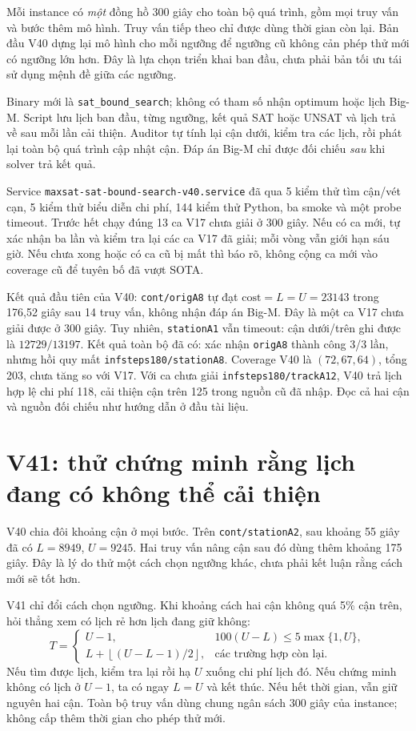 \documentclass[11pt,a4paper]{article}
\newcommand{\code}[1]{\texttt{#1}}
\newcommand{\file}[1]{\nolinkurl{#1}}
\begin{document}
Mỗi instance có \emph{một} đồng hồ 300 giây cho toàn bộ quá trình, gồm
mọi truy vấn và bước thêm mô hình. Truy vấn tiếp theo chỉ được dùng thời
gian còn lại. Bản đầu V40 dựng lại mô hình cho mỗi ngưỡng để ngưỡng cũ
không cản phép thử mới có ngưỡng lớn hơn. Đây là lựa chọn triển khai ban
đầu, chưa phải bản tối ưu tái sử dụng mệnh đề giữa các ngưỡng.

Binary mới là \file{sat\_bound\_search}; không có tham số nhận optimum
hoặc lịch Big-M. Script lưu lịch ban đầu, từng ngưỡng, kết quả SAT hoặc
UNSAT và lịch trả về sau mỗi lần cải thiện. Auditor tự tính lại cận dưới,
kiểm tra các lịch, rồi phát lại toàn bộ quá trình cập nhật cận.
Đáp án Big-M chỉ được đối chiếu \emph{sau} khi solver trả kết quả.

Service \file{maxsat-sat-bound-search-v40.service} đã qua 5 kiểm thử tìm
cận/vét cạn, 5 kiểm thử biểu diễn chi phí, 144 kiểm thử Python, ba smoke
và một probe timeout. Trước hết chạy đúng 13 ca V17 chưa giải ở 300 giây.
Nếu có ca mới, tự xác nhận ba lần và kiểm tra lại các ca V17 đã giải;
mỗi vòng vẫn giới hạn sáu giờ. Nếu chưa xong hoặc có ca cũ bị mất thì
báo rõ, không cộng ca mới vào coverage cũ để tuyên bố đã vượt SOTA.

Kết quả đầu tiên của V40: \code{cont/origA8} tự đạt
$\mathrm{cost}=L=U=23143$ trong 176,52 giây sau 14 truy vấn, không nhận
đáp án Big-M. Đây là một ca V17 chưa giải được ở 300 giây. Tuy nhiên,
\code{stationA1} vẫn timeout: cận dưới/trên ghi được là $12729/13197$.
Kết quả toàn bộ đã có: xác nhận \code{origA8} thành công 3/3 lần, nhưng
hồi quy mất \code{infsteps180/stationA8}. Coverage V40 là $(72,67,64)$,
tổng 203, chưa tăng so với V17. Với ca chưa giải \code{infsteps180/trackA12},
V40 trả lịch hợp lệ chi phí 118, cải thiện cận trên 125 trong nguồn cũ đã
nhập. Đọc cả hai cận và nguồn đối chiếu như hướng dẫn ở đầu tài liệu.

\section{V41: thử chứng minh rằng lịch đang có không thể cải thiện}

V40 chia đôi khoảng cận ở mọi bước. Trên \code{cont/stationA2}, sau khoảng
55 giây đã có $L=8949$, $U=9245$. Hai truy vấn nâng cận sau đó dùng thêm
khoảng 175 giây. Đây là lý do thử một cách chọn ngưỡng khác, chưa phải
kết luận rằng cách mới sẽ tốt hơn.

V41 chỉ đổi cách chọn ngưỡng. Khi khoảng cách hai cận không quá 5\% cận
trên, hỏi thẳng xem có lịch rẻ hơn lịch đang giữ không:
\[
T=\begin{cases}
U-1, & 100(U-L)\le 5\max\{1,U\},\\
L+\left\lfloor (U-L-1)/2\right\rfloor, & \text{các trường hợp còn lại}.
\end{cases}
\]
Nếu tìm được lịch, kiểm tra lại rồi hạ $U$ xuống chi phí lịch đó. Nếu
chứng minh không có lịch ở $U-1$, ta có ngay $L=U$ và kết thúc. Nếu hết
thời gian, vẫn giữ nguyên hai cận. Toàn bộ truy vấn dùng chung ngân sách
300 giây của instance; không cấp thêm thời gian cho phép thử mới.
\end{document}
